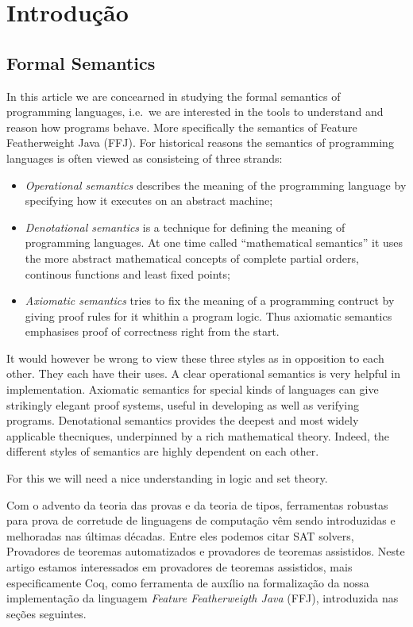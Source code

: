 \chapter{Introdução}

\section{Formal Semantics} In this article we are concearned in studying the
formal semantics of programming languages, i.e.\ we are interested in the tools
to understand and reason how programs behave. More specifically the semantics of
Feature Featherweight Java (FFJ).  For historical reasons the semantics of programming
languages is often viewed as consisteing of three strands: 

\begin{itemize} 
    \item \textit{Operational semantics} describes the meaning of the
        programming language by specifying how it executes on an abstract machine;

    \item \textit{Denotational semantics} is a technique for defining the
    meaning of programming languages. At one time called ``mathematical
    semantics'' it uses the more abstract mathematical concepts of complete
    partial orders, continous functions and least fixed points; 

    \item \textit{Axiomatic semantics} tries to fix the meaning of a programming
        contruct by giving proof rules for it whithin a program logic. Thus
        axiomatic semantics emphasises proof of correctness right from the start.
\end{itemize}

It would however be wrong to view these three styles as in opposition to
each other. They each have their uses. A clear operational semantics is very
helpful in implementation. Axiomatic semantics for special kinds of
languages can give strikingly elegant proof systems, useful in developing as
well as verifying programs. Denotational semantics provides the deepest and
most widely applicable thecniques, underpinned by a rich mathematical
theory. Indeed, the different styles  of semantics are highly dependent on
each other. 

For this we will need a nice understanding in logic and set theory.

Com o advento da teoria das provas e da teoria de tipos\cite{martinlof},
ferramentas robustas para prova de corretude de linguagens de computação vêm
sendo introduzidas e melhoradas nas últimas décadas. Entre eles podemos citar
SAT solvers, Provadores de teoremas automatizados e provadores de teoremas
assistidos.  Neste artigo estamos interessados em provadores de teoremas
assistidos, mais especificamente Coq, como ferramenta de auxílio na formalização
da nossa implementação da linguagem \textit{Feature Featherweigth Java} (FFJ),
introduzida nas seções seguintes. 

